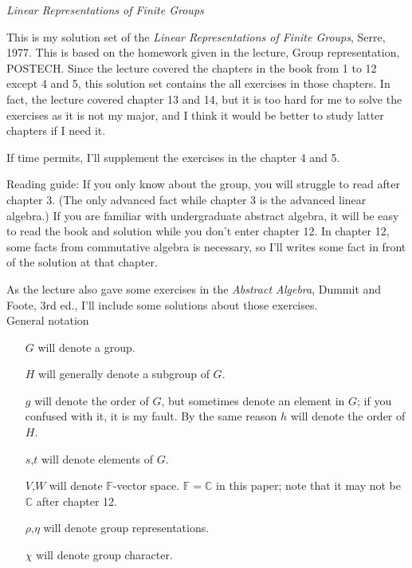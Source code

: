 \documentclass[a4paper, 12pt]{article}
\theoremstyle{Mydefinition}
\theoremstyle{Mytheorem}
\begin{document}
\thispagestyle{myfirstpage}
\begin{center}
	\Large{\textit{Linear Representations of Finite Groups}}
\end{center}

This is my solution set of the \textit{Linear Representations of Finite Groups}, Serre, 1977. This is based on the homework given in the lecture, Group representation, POSTECH. Since the lecture covered the chapters in the book from 1 to 12 except 4 and 5, this solution set contains the all exercises in those chapters. In fact, the lecture covered chapter 13 and 14, but it is too hard for me to solve the exercises as it is not my major, and I think it would be better to study latter chapters if I need it.

If time permits, I'll supplement the exercises in the chapter 4 and 5.

Reading guide: If you only know about the group, you will struggle to read after chapter 3. (The only advanced fact while chapter 3 is the advanced linear algebra.) If you are familiar with undergraduate abstract algebra, it will be easy to read the book and solution while you don't enter chapter 12. In chapter 12, some facts from commutative algebra is necessary, so I'll writes some fact in front of the solution at that chapter.

As the lecture also gave some exercises in the \textit{Abstract Algebra}, Dummit and Foote, 3rd ed., I'll include some solutions about those exercises.\\

General notation
\begin{enumerate}
    \item[$G$] will denote a group.
    \item[$H$] will generally denote a subgroup of $G$.
    \item[$g$] will denote the order of $G$, but sometimes denote an element in $G$; if you confused with it, it is my fault. By the same reason $h$ will denote the order of $H$.
    \item[$s$,$t$] will denote elements of $G$.
    \item[$V$,$W$] will denote $\mathbb{F}$-vector space. $\mathbb{F}=\mathbb{C}$ in this paper; note that it may not be $\mathbb{C}$ after chapter 12.
    \item[$\rho$,$\eta$] will denote group representations.
    \item[$\chi$] will denote group character.
\end{enumerate}
\end{document}
